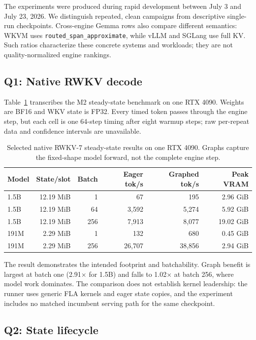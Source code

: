 \documentclass[10pt,letterpaper]{article}
\newcommand{\code}[1]{\texttt{#1}}
\newcommand{\wkvm}{\textsc{WKVM}}
\begin{document}
The experiments were produced during rapid development between July 3 and
July 23, 2026.  We distinguish repeated, clean campaigns from descriptive
single-run checkpoints.  Cross-engine Gemma rows also compare different
semantics: \wkvm{} uses \code{routed\_span\_approximate}, while vLLM and SGLang
use full KV.  Such ratios characterize these concrete systems and workloads;
they are not quality-normalized engine rankings.

\subsection{Q1: Native RWKV decode}

Table~\ref{tab:rwkv} transcribes the M2 steady-state benchmark on one RTX 4090.
Weights are BF16 and WKV state is FP32.  Every timed token passes through the
engine step, but each cell is one 64-step timing after eight warmup steps; raw
per-repeat data and confidence intervals are unavailable.

\begin{table}[t]
\centering
\caption{Selected native RWKV-7 steady-state results on one RTX 4090.  Graphs
capture the fixed-shape model forward, not the complete engine step.}
\label{tab:rwkv}
\small
\begin{tabular}{@{}lrrrrr@{}}
\toprule
Model & State/slot & Batch & Eager tok/s & Graphed tok/s & Peak VRAM \\
\midrule
1.5B & 12.19 MiB & 1   & 67    & 195   & 2.96 GiB \\
1.5B & 12.19 MiB & 64  & 3,592 & 5,274 & 5.92 GiB \\
1.5B & 12.19 MiB & 256 & 7,913 & 8,077 & 19.02 GiB \\
191M & 2.29 MiB  & 1   & 132   & 680   & 0.45 GiB \\
191M & 2.29 MiB  & 256 & 26,707 & 38,856 & 2.94 GiB \\
\bottomrule
\end{tabular}
\end{table}

The result demonstrates the intended footprint and batchability.  Graph
benefit is largest at batch one (2.91$\times$ for 1.5B) and falls to
1.02$\times$ at batch 256, where model work dominates.  The comparison does
not establish kernel leadership: the runner uses generic FLA kernels and eager
state copies, and the experiment includes no matched incumbent serving path
for the same checkpoint.

\subsection{Q2: State lifecycle}
\end{document}
